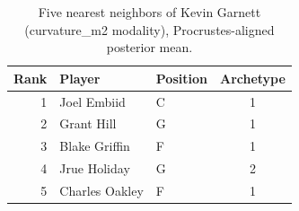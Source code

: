 \begin{table}[htbp]
  \centering\small
  \begin{tabular}{rllc}
    \toprule
    Rank & Player & Position & Archetype \\
    \midrule
    1 & Joel Embiid & C & 1 \\
    2 & Grant Hill & G & 1 \\
    3 & Blake Griffin & F & 1 \\
    4 & Jrue Holiday & G & 2 \\
    5 & Charles Oakley & F & 1 \\
    \bottomrule
  \end{tabular}
  \caption{Five nearest neighbors of Kevin Garnett (curvature_m2 modality), Procrustes-aligned posterior mean.}
  \label{tab:Kevin_Garnett_neighbors_curvature_m2}
\end{table}

